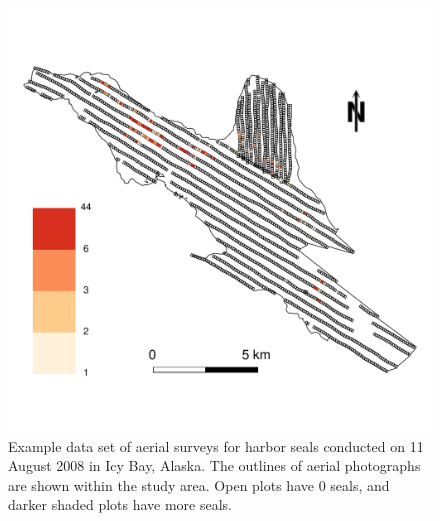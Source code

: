 \documentclass[12pt, titlepage]{article}\usepackage[]{graphicx}\usepackage[]{color}
\begin{document}
	\begin{figure}[H]
	\begin{center}
	\includegraphics[width=450pt]{studyArea.pdf}
	\end{center}
	\caption{Example data set of aerial surveys for harbor seals conducted on 11 August 2008 in Icy Bay, Alaska. The outlines of aerial photographs are shown within the study area. Open plots have 0 seals, and darker shaded plots have more seals.  \label{fig:studyArea}}
	\end{figure}

\end{document}
